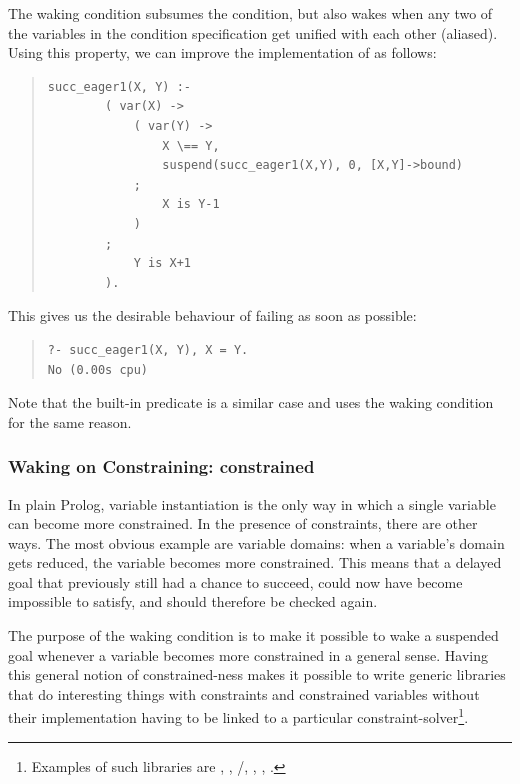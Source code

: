 The  waking condition subsumes the  condition,
but
also wakes when any two of the variables in the condition specification get
unified with each other (aliased).
Using this property, we can improve the implementation of
as follows:
\begin{quote}
\begin{verbatim}
succ_eager1(X, Y) :-
        ( var(X) ->
            ( var(Y) ->
                X \== Y,
                suspend(succ_eager1(X,Y), 0, [X,Y]->bound)
            ;
                X is Y-1
            )
        ;
            Y is X+1
        ).
\end{verbatim}
\end{quote}
This gives us the desirable behaviour of failing as soon as possible:
\begin{quote}
\begin{verbatim}
?- succ_eager1(X, Y), X = Y.
No (0.00s cpu)
\end{verbatim}
\end{quote}
Note that the built-in predicate
is a similar case and uses the  waking condition for the
same reason.



\subsubsection{Waking on Constraining: constrained}

In plain Prolog, variable instantiation is the only way in which a single
variable can become more constrained.  In the presence of constraints,
there are other ways. The most obvious example are variable domains:
when a variable's domain gets reduced, the variable becomes more
constrained. This means that a delayed goal that previously still had
a chance to succeed, could now have become impossible to satisfy,
and should therefore be checked again.

The purpose of the  waking condition is to make it
possible to wake a suspended goal whenever a variable becomes more
constrained in a general sense. Having this general notion
of constrained-ness makes it possible to write generic libraries
that do interesting things with constraints and constrained variables
without their implementation having to be linked to a particular
constraint-solver\footnote{%
  Examples of such libraries are ,
  , /, ,
  , .}.

